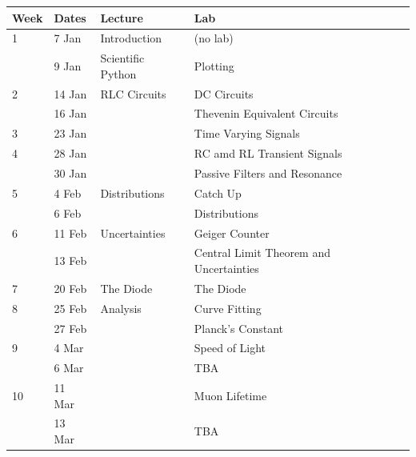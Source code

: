 \documentclass[12pt]{article}
\begin{document}
\begin{table}[h!]
\normalsize %
\begin{tabular}{ lllll }
\hline
\textbf{Week} & \textbf{Dates} & \textbf{Lecture} & \textbf{Lab} \\
\hline
1 & 7 Jan & Introduction & (no lab) \\
   & 9 Jan & Scientific Python & Plotting\\
\hline
2 & 14 Jan & RLC Circuits & DC Circuits \\
  & 16 Jan & & Thevenin Equivalent Circuits \\
\hline
3 & 23 Jan & & Time Varying Signals \\
\hline
4 & 28 Jan & & RC amd RL Transient Signals \\
   & 30 Jan &  &  Passive Filters and Resonance \\
\hline
5 & 4 Feb & Distributions & Catch Up \\
   & 6 Feb & & Distributions \\
\hline
6 & 11 Feb & Uncertainties & Geiger Counter \\
   & 13 Feb & & Central Limit Theorem and Uncertainties \\
\hline
7 & 20 Feb & The Diode & The Diode\\
\hline
8 & 25 Feb & Analysis & Curve Fitting \\
   & 27 Feb & & Planck's Constant \\
\hline
9 & 4 Mar & & Speed of Light \\
   & 6 Mar & & TBA \\
\hline
10 & 11 Mar & & Muon Lifetime\\
   & 13 Mar & & TBA\\
\hline
\end{tabular} 
\end{table}
\end{document}
